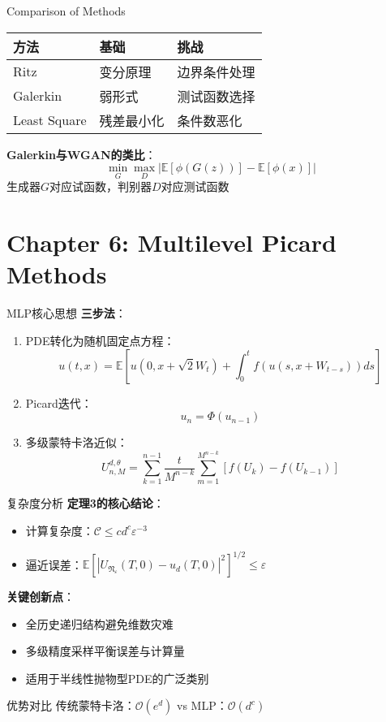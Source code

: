 \documentclass[aspectratio=169]{beamer}
\begin{document}
	\begin{frame}{Comparison of Methods}
		\begin{table}[ht]
		\centering
		\begin{tabular}{|l|l|l|}
		\hline
		\textbf{方法} & \textbf{基础} & \textbf{挑战} \\
		\hline
		Ritz & 变分原理 & 边界条件处理 \\
		Galerkin & 弱形式 & 测试函数选择 \\
		Least Square & 残差最小化 & 条件数恶化 \\
		\hline
		\end{tabular}
		\end{table}

		\textbf{Galerkin与WGAN的类比}：
		\[
		\min_G \max_D \left| \mathbb{E}[\phi(G(z))] - \mathbb{E}[\phi(x)] \right|
		\]
		生成器$G$对应试函数，判别器$D$对应测试函数
	\end{frame}

	\section{Chapter 6: Multilevel Picard Methods}
	\begin{frame}{MLP核心思想}
		\textbf{三步法}：
		\begin{enumerate}
			\item PDE转化为随机固定点方程：
			\[
			u(t,x) = \mathbb{E}\left[ u(0,x+\sqrt{2}W_t) + \int_0^t f(u(s,x+W_{t-s}))ds \right]
			\]
			\item Picard迭代：
			\[
			u_{n} = \Phi(u_{n-1})
			\]
			\item 多级蒙特卡洛近似：
			\[
			U_{n,M}^{d,\theta} = \sum_{k=1}^{n-1} \frac{t}{M^{n-k}} \sum_{m=1}^{M^{n-k}} [f(U_k) - f(U_{k-1})] 
			\]
		\end{enumerate}
	\end{frame}

	\begin{frame}{复杂度分析}
		\textbf{定理3的核心结论}：
		\begin{itemize}
			\item 计算复杂度：$\mathcal{C} \leq cd^c \varepsilon^{-3}$
			\item 逼近误差：$\mathbb{E}[|U_{\mathfrak{N}_\varepsilon}(T,0)-u_d(T,0)|^2]^{1/2} \leq \varepsilon$
		\end{itemize}

		\textbf{关键创新点}：
		\begin{itemize}
			\item 全历史递归结构避免维数灾难
			\item 多级精度采样平衡误差与计算量
			\item 适用于半线性抛物型PDE的广泛类别
		\end{itemize}

		\begin{exampleblock}{优势对比}
		传统蒙特卡洛：$\mathcal{O}(e^d)$ vs MLP：$\mathcal{O}(d^c)$
		\end{exampleblock}
	\end{frame}
\end{document}
